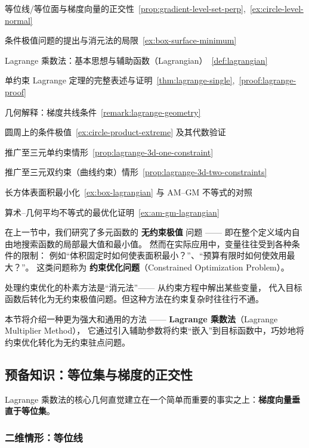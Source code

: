 \documentclass[lang=cn,11pt]{elegantbook}
\begin{document}
\begin{introduction}
  \item 等位线/等位面与梯度向量的正交性~\ref{prop:gradient-level-set-perp},~\ref{ex:circle-level-normal}
  \item 条件极值问题的提出与消元法的局限~\ref{ex:box-surface-minimum}
  \item Lagrange 乘数法：基本思想与辅助函数（Lagrangian）~\ref{def:lagrangian}
  \item 单约束 Lagrange 定理的完整表述与证明~\ref{thm:lagrange-single},~\ref{proof:lagrange-proof}
  \item 几何解释：梯度共线条件~\ref{remark:lagrange-geometry}
  \item 圆周上的条件极值~\ref{ex:circle-product-extreme} 及其代数验证
  \item 推广至三元单约束情形~\ref{prop:lagrange-3d-one-constraint}
  \item 推广至三元双约束（曲线约束）情形~\ref{prop:lagrange-3d-two-constraints}
  \item 长方体表面积最小化~\ref{ex:box-lagrangian} 与 AM--GM 不等式的对照
  \item 算术--几何平均不等式的最优化证明~\ref{ex:am-gm-lagrangian}
\end{introduction}

在上一节中，我们研究了多元函数的 \textbf{无约束极值} 问题 ——
即在整个定义域内自由地搜索函数的局部最大值和最小值。
然而在实际应用中，变量往往受到各种条件的限制：
例如“体积固定时如何使表面积最小？”、“预算有限时如何使效用最大？”。
这类问题称为 \textbf{约束优化问题}（Constrained Optimization Problem）。

处理约束优化的朴素方法是“消元法”—— 从约束方程中解出某些变量，
代入目标函数后转化为无约束极值问题。但这种方法在约束复杂时往往行不通。

本节将介绍一种更为强大和通用的方法 —— \textbf{Lagrange 乘数法}（Lagrange Multiplier Method），
它通过引入辅助参数将约束“嵌入”到目标函数中，巧妙地将约束优化转化为无约束驻点问题。


\subsection{预备知识：等位集与梯度的正交性}

Lagrange 乘数法的核心几何直觉建立在一个简单而重要的事实之上：\textbf{梯度向量垂直于等位集}。

\subsubsection*{二维情形：等位线}
\end{document}
